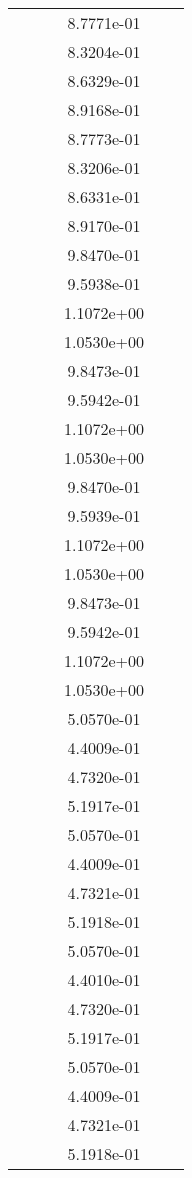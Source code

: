 \begin{xltabular}{\textwidth}{r|rS[table-format=1.3e+2]S[table-format=1.4e+2]S[table-format=1.4e+2]S[table-format=-1.5]}
&  &  & 8.7771e-01 & & \\
&  &  & 8.3204e-01 & & \\
&  &  & 8.6329e-01 & & \\
&  &  & 8.9168e-01 & & \\
&  &  & 8.7773e-01 & & \\
&  &  & 8.3206e-01 & & \\
&  &  & 8.6331e-01 & & \\
&  &  & 8.9170e-01 & & \\
&  &  & 9.8470e-01 & & \\
&  &  & 9.5938e-01 & & \\
&  &  & 1.1072e+00 & & \\
&  &  & 1.0530e+00 & & \\
&  &  & 9.8473e-01 & & \\
&  &  & 9.5942e-01 & & \\
&  &  & 1.1072e+00 & & \\
&  &  & 1.0530e+00 & & \\
&  &  & 9.8470e-01 & & \\
&  &  & 9.5939e-01 & & \\
&  &  & 1.1072e+00 & & \\
&  &  & 1.0530e+00 & & \\
&  &  & 9.8473e-01 & & \\
&  &  & 9.5942e-01 & & \\
&  &  & 1.1072e+00 & & \\
&  &  & 1.0530e+00 & & \\
&  &  & 5.0570e-01 & & \\
&  &  & 4.4009e-01 & & \\
&  &  & 4.7320e-01 & & \\
&  &  & 5.1917e-01 & & \\
&  &  & 5.0570e-01 & & \\
&  &  & 4.4009e-01 & & \\
&  &  & 4.7321e-01 & & \\
&  &  & 5.1918e-01 & & \\
&  &  & 5.0570e-01 & & \\
&  &  & 4.4010e-01 & & \\
&  &  & 4.7320e-01 & & \\
&  &  & 5.1917e-01 & & \\
&  &  & 5.0570e-01 & & \\
&  &  & 4.4009e-01 & & \\
&  &  & 4.7321e-01 & & \\
&  &  & 5.1918e-01 & & \\

\end{xltabular}
